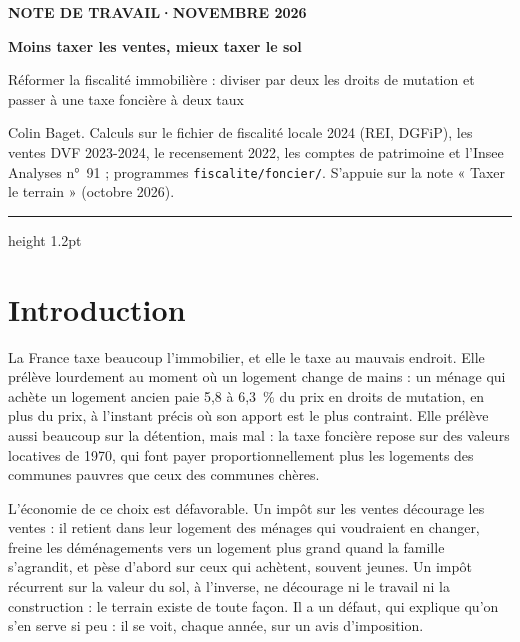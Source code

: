 \documentclass[11pt,a4paper]{article}
\begin{document}
\renewcommand{\figurename}{Figure}\renewcommand{\tablename}{Tableau}

\thispagestyle{empty}
\vspace*{0.6cm}
{\footnotesize\color{ocre}\bfseries NOTE DE TRAVAIL\quad·\quad NOVEMBRE 2026\par}
\vspace{8pt}
{\fontsize{22}{26}\selectfont\bfseries\color{bleu}Moins taxer les ventes, mieux taxer le sol\par}
\vspace{6pt}
{\large Réformer la fiscalité immobilière : diviser par deux les droits de mutation et passer à une taxe
foncière à deux taux\par}
\vspace{8pt}
{\small Colin Baget. Calculs sur le fichier de fiscalité locale 2024 (REI, DGFiP), les ventes DVF 2023-2024,
le recensement 2022, les comptes de patrimoine et l'Insee Analyses n°~91 ; programmes
\texttt{fiscalite/foncier/}. S'appuie sur la note « Taxer le terrain » (octobre 2026).\par}
\vspace{6pt}
{\color{bleu}\hrule height 1.2pt}
\vspace{4pt}

\section*{Introduction}

La France taxe beaucoup l'immobilier, et elle le taxe au mauvais endroit. Elle prélève lourdement au
moment où un logement change de mains : un ménage qui achète un logement ancien paie 5,8 à 6,3~\% du prix en
droits de mutation, en plus du prix, à l'instant précis où son apport est le plus contraint. Elle prélève
aussi beaucoup sur la détention, mais mal : la taxe foncière repose sur des valeurs locatives de 1970, qui
font payer proportionnellement plus les logements des communes pauvres que ceux des communes chères.

L'économie de ce choix est défavorable. Un impôt sur les ventes décourage les ventes : il retient dans leur
logement des ménages qui voudraient en changer, freine les déménagements vers un logement plus grand quand
la famille s'agrandit, et pèse d'abord sur ceux qui achètent, souvent jeunes. Un impôt récurrent sur la
valeur du sol, à l'inverse, ne décourage ni le travail ni la construction : le terrain existe de toute
façon. Il a un défaut, qui explique qu'on s'en serve si peu : il se voit, chaque année, sur un avis
d'imposition.
\end{document}
